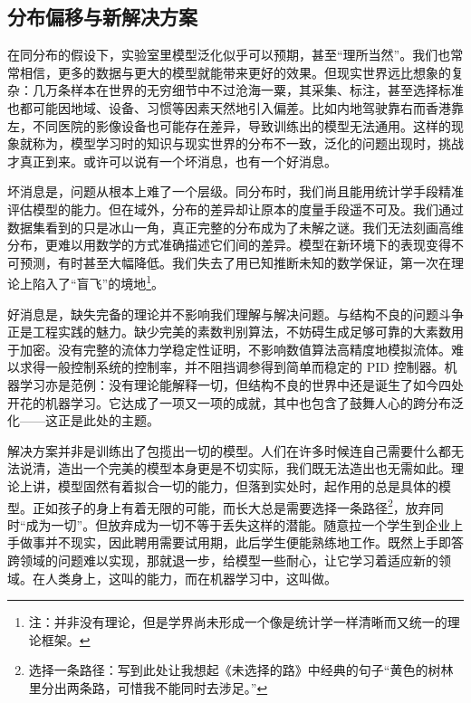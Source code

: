 \newpage

\subsection{分布偏移与新解决方案}

在同分布的假设下，实验室里模型泛化似乎可以预期，甚至“理所当然”。我们也常常相信，更多的数据与更大的模型就能带来更好的效果。但现实世界远比想象的复杂：几万条样本在世界的无穷细节中不过沧海一粟，其采集、标注，甚至选择标准也都可能因地域、设备、习惯等因素天然地引入偏差。比如内地驾驶靠右而香港靠左，不同医院的影像设备也可能存在差异，导致训练出的模型无法通用。这样的现象就称为，模型学习时的知识与现实世界的分布不一致，泛化的问题出现时，挑战才真正到来。或许可以说有一个坏消息，也有一个好消息。

坏消息是，问题从根本上难了一个层级。同分布时，我们尚且能用统计学手段精准评估模型的能力。但在域外，分布的差异却让原本的度量手段遥不可及。我们通过数据集看到的只是冰山一角，真正完整的分布成为了未解之谜。我们无法刻画高维分布，更难以用数学的方式准确描述它们间的差异。模型在新环境下的表现变得不可预测，有时甚至大幅降低。我们失去了用已知推断未知的数学保证，第一次在理论上陷入了“盲飞”的境地\footnote{注：并非没有理论，但是学界尚未形成一个像是统计学一样清晰而又统一的理论框架。}。

好消息是，缺失完备的理论并不影响我们理解与解决问题。与结构不良的问题斗争正是工程实践的魅力。缺少完美的素数判别算法，不妨碍生成足够可靠的大素数用于加密。没有完整的流体力学稳定性证明，不影响数值算法高精度地模拟流体。难以求得一般控制系统的控制率，并不阻挡调参得到简单而稳定的 PID 控制器。机器学习亦是范例：没有理论能解释一切，但结构不良的世界中还是诞生了如今四处开花的机器学习。它达成了一项又一项的成就，其中也包含了鼓舞人心的跨分布泛化——这正是此处的主题。

解决方案并非是训练出了包揽出一切的模型。人们在许多时候连自己需要什么都无法说清，造出一个完美的模型本身更是不切实际，我们既无法造出也无需如此。理论上讲，模型固然有着拟合一切的能力，但落到实处时，起作用的总是具体的模型。正如孩子的身上有着无限的可能，而长大总是需要选择一条路径\footnote{选择一条路径：写到此处让我想起《未选择的路》中经典的句子“黄色的树林里分出两条路，可惜我不能同时去涉足。”}，放弃同时“成为一切”。但放弃成为一切不等于丢失这样的潜能。随意拉一个学生到企业上手做事并不现实，因此聘用需要试用期，此后学生便能熟练地工作。既然上手即答跨领域的问题难以实现，那就退一步，给模型一些耐心，让它学习着适应新的领域。在人类身上，这叫的能力，而在机器学习中，这叫做。

